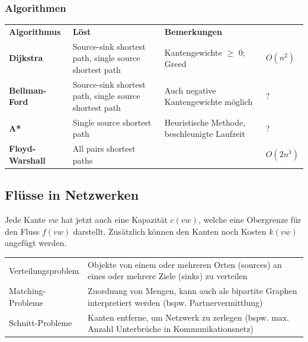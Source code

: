   \subsubsection{Algorithmen}
    \begin{tabularx}{\textwidth}{p{3cm} p{4cm} X p{2cm}}
      \textbf{Algorithmus} & \textbf{Löst} & \textbf{Bemerkungen} \\
      \textbf{Dijkstra} 
        & Source-sink shortest path, single source shortest path
        & Kantengewichte $\geq$ 0; Greed
        & $O(n^2)$\\
      \textbf{Bellman-Ford}
        & Source-sink shortest path, single source shortest path
        & Auch negative Kantengewichte möglich 
        & ?\\
      \textbf{A*} 
        & Single source shortest path
        & Heuristische Methode, beschleunigte Laufzeit
        & ?\\
      \textbf{Floyd-Warshall }
        & All pairs shortest paths 
        &
        & $O(2n^3)$\\
    \end{tabularx}
	
\subsection{Flüsse in Netzwerken }
  Jede Kante $vw$ hat jetzt auch eine Kapazität $c(vw)$, welche eine Obergrenze für den Fluss $f(vw)$ darstellt. Zusätzlich können den Kanten noch Kosten $k(vw)$ angefügt werden.
  
  \begin{tabularx}{\textwidth}{l X}
    Verteilungsproblem
      & Objekte von einem oder mehreren Orten (sources) an eines oder mehrere Ziele (sinks) zu verteilen\\
    Matching-Probleme
      & Zuordnung von Mengen, kann auch als bipartite Graphen interpretiert werden (bspw. Partnervermittlung) \\
    Schnitt-Probleme
      & Kanten entferne, um Netzwerk zu zerlegen (bspw. max. Anzahl Unterbrüche in Kommunikationsnetz)\\
  \end{tabularx}
  
